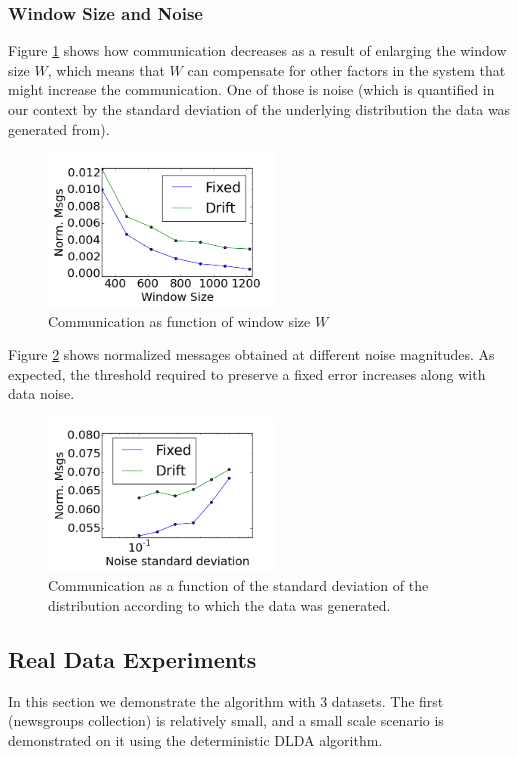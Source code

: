 \documentclass[11pt,twocolumn,varwidth=true,a4paper,fleqn]{article}
\begin{document}
\subsubsection{Window Size and Noise}
Figure \ref{WindowSize} shows how communication decreases as a result
of enlarging the window size $W$, which means that $W$ can compensate for other
factors in the system that might increase the communication. One of those is
noise (which is quantified in our context by the standard deviation of the
underlying distribution the data was generated from).
 \begin{figure}[h]
	\centering
	\includegraphics[width=60mm]{CommunicationOfFixedVsDrift/WindowSize.png}
	\caption{Communication as function of window size $W$}
	\label{WindowSize}
	\end{figure}
Figure \ref{Noise} shows normalized messages obtained at different
noise magnitudes. As expected, the threshold required to preserve a
fixed error increases along with data noise.
\begin{figure}[h]
	\centering
	\includegraphics[width=60mm]{CommunicationOfFixedVsDrift/Noise.png}
	\caption{Communication as a function of the standard deviation of the
	distribution according to which the data was generated.}
	\label{Noise}
	\end{figure}

\subsection{Real Data Experiments}
In this section we demonstrate the algorithm with 3 datasets. The first
(newsgroups collection) is relatively small, and a small scale
scenario is demonstrated on it using the deterministic DLDA algorithm. 
\end{document}
